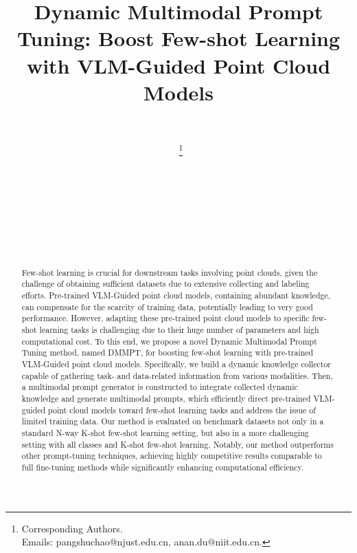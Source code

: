 \documentclass{ecai}
\begin{document}
\begin{frontmatter}

\title{Dynamic Multimodal Prompt Tuning: Boost Few-shot Learning with VLM-Guided Point Cloud Models}

\author[A]{~}
\author[A]{~\thanks{Corresponding Authors. \\Emails: pangshuchao@njust.edu.cn, anan.du@niit.edu.cn.}}
\author[B]{~\footnotemark[*]}
\author[A]{~} 
\author[A]{~}  
\author[C]{~} 

\address[A]{School of Cyber Science and Engineering, Nanjing University of Science and Technology, China}
\address[B]{Nanjing Vocational University of Industry Technology, China}
\address[C]{Artificial Intelligence Center, University of Oviedo at Gijón, Spain}

   
\begin{abstract}
Few-shot learning is crucial for downstream tasks involving point clouds, given the challenge of obtaining sufficient datasets due to extensive collecting and labeling efforts. Pre-trained VLM-Guided point cloud models, containing abundant knowledge, can compensate for the scarcity of training data, potentially leading to very good performance. However, adapting these pre-trained point cloud models to specific few-shot learning tasks is challenging due to their huge number of parameters and high computational cost. To this end, we propose a novel Dynamic Multimodal Prompt Tuning method, named DMMPT, for boosting few-shot learning with pre-trained VLM-Guided point cloud models. Specifically, we build a dynamic knowledge collector capable of gathering task- and data-related information from various modalities. Then, a multimodal prompt generator is constructed to integrate collected dynamic knowledge and generate multimodal prompts, which efficiently direct pre-trained VLM-guided point cloud models toward few-shot learning tasks and address the issue of limited training data. Our method is evaluated on benchmark datasets not only in a standard N-way K-shot few-shot learning setting, but also in a more challenging setting with all classes and K-shot few-shot learning. Notably, our method outperforms other prompt-tuning techniques, achieving highly competitive results comparable to full fine-tuning methods while significantly enhancing computational efficiency.

\end{abstract}

\end{frontmatter}
\end{document}
